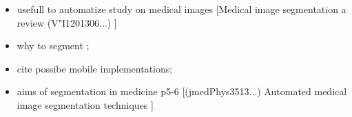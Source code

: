 \documentclass[../main.tex]{subfiles}
\begin{document}
\begin{itemize}

    \item usefull to automatize study on medical images [Medical image segmentation a review (V"I1201306...) \cite{segmentation_review_1}]
   \item why to segment \cite{sgmentation_1_survey};
   
    \item cite possibe mobile implementations;
    \item
aims of segmentation in medicine p5-6
[(jmedPhys3513...) Automated medical image segmentation techniques \cite{automated_segm_tech}]
\end{itemize}
\end{document}
